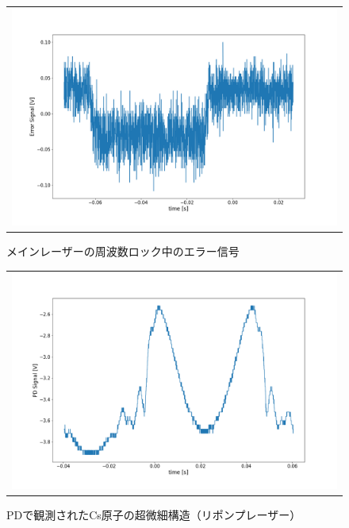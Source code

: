 \documentclass[uplatex, dvipdfmx, a4paper, report, papersize, 11pt]{jsbook}
\begin{document}
\begin{figure}[htpb]
\begin{tabular}{c}
      \begin{minipage}{1\hsize}
        \centering
          \includegraphics[keepaspectratio,  scale=0.25,  angle=0]
                          {figures/saturated-absorption/main-locking-error.png}
                          \caption{メインレーザーの周波数ロック中のエラー信号}
                          \label{main-locking-error}
      \end{minipage}
    \end{tabular}
\end{figure}

\newpage
\begin{figure}[htpb]
  \centering
    \begin{tabular}{c}
      \begin{minipage}{1\hsize}
        \centering
          \includegraphics[keepaspectratio,  scale=0.35,  angle=0]
                          {figures/saturated-absorption/Repump_PD_signal.png}
                          \caption{PDで観測されたCs原子の超微細構造（リポンプレーザー）}
                          \label{Repump_PD_signal}
      \end{minipage}
    \end{tabular}
\end{figure}
\end{document}
